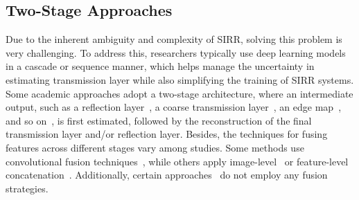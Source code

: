 \subsection{Two-Stage Approaches}
\label{sec:two-stage}

Due to the inherent ambiguity and complexity of SIRR, solving this problem is very challenging. To address this, researchers typically use deep learning models in a cascade or sequence manner, which helps manage the uncertainty in estimating transmission layer while also simplifying the training of SIRR systems.
Some academic approaches adopt a two-stage architecture, where an intermediate output, such as a reflection layer~\cite{feng2021deep,li2023two,hu2023single,kim2020single,wan2020reflection,zhong2024language}, a coarse transmission layer~\cite{feng2021deep,hu2023single,kim2020single,zhong2024language}, an edge map~\cite{wan2019corrn,fan2017generic,zhu2024revisiting}, and so on~\cite{zheng2021single}, is first estimated, followed by the reconstruction of the final transmission layer and/or reflection layer. Besides, the techniques for fusing features across different stages vary among studies. Some methods use convolutional fusion techniques~\cite{wan2019corrn, feng2021deep, li2023two}, while others apply image-level~\cite{fan2017generic, zheng2021single, zhu2024revisiting} or feature-level concatenation~\cite{zhong2024language}. Additionally, certain approaches~\cite{hu2023single, kim2020single, wan2020reflection} do not employ any fusion strategies.

